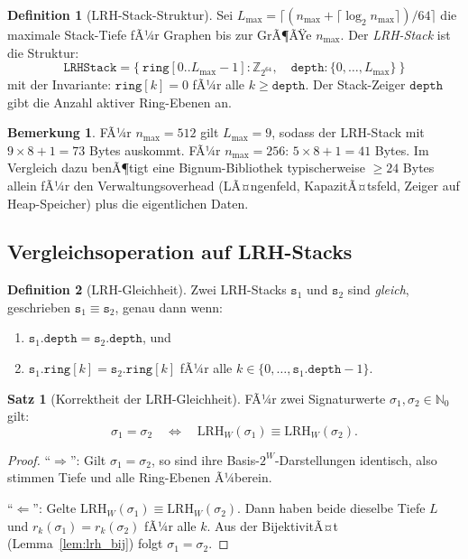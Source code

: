 ﻿\documentclass[a4paper,12pt]{article}
\theoremstyle{definition}
\newtheorem{definition}{Definition}
\newtheorem{satz}{Satz}
\newtheorem{bemerkung}{Bemerkung}
\begin{document}
\begin{definition}[LRH-Stack-Struktur]
\label{def:lrh_stack}
Sei $L_{\max} = \lceil (n_{\max} + \lceil \log_2 n_{\max} \rceil) / 64 \rceil$
die maximale Stack-Tiefe fÃ¼r Graphen bis zur GrÃ¶ÃŸe $n_{\max}$.
Der \emph{LRH-Stack} ist die Struktur:
\[
  \mathtt{LRHStack} = \{\ \mathtt{ring}[0..L_{\max}-1] : \mathbb{Z}_{2^{64}},\quad
                          \mathtt{depth} : \{0,\ldots,L_{\max}\}\ \}
\]
mit der Invariante: $\mathtt{ring}[k] = 0$ fÃ¼r alle $k \geq \mathtt{depth}$.
Der Stack-Zeiger $\mathtt{depth}$ gibt die Anzahl aktiver Ring-Ebenen an.
\end{definition}

\begin{bemerkung}
FÃ¼r $n_{\max} = 512$ gilt $L_{\max} = 9$, sodass der LRH-Stack mit
$9 \times 8 + 1 = 73$ Bytes auskommt. FÃ¼r $n_{\max} = 256$: $5 \times 8 + 1 = 41$ Bytes.
Im Vergleich dazu benÃ¶tigt eine Bignum-Bibliothek typischerweise $\geq 24$ Bytes
allein fÃ¼r den Verwaltungsoverhead (LÃ¤ngenfeld, KapazitÃ¤tsfeld, Zeiger auf Heap-Speicher)
plus die eigentlichen Daten.
\end{bemerkung}

\subsection{Vergleichsoperation auf LRH-Stacks}

\begin{definition}[LRH-Gleichheit]
\label{def:lrh_eq}
Zwei LRH-Stacks $\mathtt{s}_1$ und $\mathtt{s}_2$ sind \emph{gleich}, geschrieben
$\mathtt{s}_1 \equiv \mathtt{s}_2$, genau dann wenn:
\begin{enumerate}
  \item $\mathtt{s}_1.\mathtt{depth} = \mathtt{s}_2.\mathtt{depth}$, und
  \item $\mathtt{s}_1.\mathtt{ring}[k] = \mathtt{s}_2.\mathtt{ring}[k]$ fÃ¼r alle
        $k \in \{0,\ldots,\mathtt{s}_1.\mathtt{depth}-1\}$.
\end{enumerate}
\end{definition}

\begin{satz}[Korrektheit der LRH-Gleichheit]
\label{satz:lrh_eq_korrekt}
FÃ¼r zwei Signaturwerte $\sigma_1, \sigma_2 \in \mathbb{N}_0$ gilt:
\[
  \sigma_1 = \sigma_2 \quad \Longleftrightarrow \quad
  \mathrm{LRH}_W(\sigma_1) \equiv \mathrm{LRH}_W(\sigma_2).
\]
\end{satz}

\begin{proof}
``$\Rightarrow$'': Gilt $\sigma_1 = \sigma_2$, so sind ihre Basis-$2^W$-Darstellungen
identisch, also stimmen Tiefe und alle Ring-Ebenen Ã¼berein.

``$\Leftarrow$'': Gelte $\mathrm{LRH}_W(\sigma_1) \equiv \mathrm{LRH}_W(\sigma_2)$.
Dann haben beide dieselbe Tiefe $L$ und $r_k(\sigma_1) = r_k(\sigma_2)$ fÃ¼r alle $k$.
Aus der BijektivitÃ¤t (Lemma~\ref{lem:lrh_bij}) folgt $\sigma_1 = \sigma_2$.
\end{proof}
\end{document}
